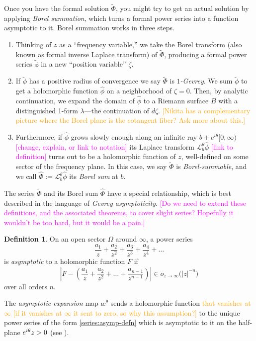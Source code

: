 \documentclass{article}
\let\Re\relax
\DeclareMathOperator{\Re}{Re}
\theoremstyle{definition}
\newtheorem{defn}{Definition}
\newcommand{\series}[1]{\tilde{#1}}
\newcommand{\laplace}{\mathcal{L}}
\newcommand{\aexp}{\text{\ae}}
\begin{document}
Once you have the formal solution $\series{\Phi}$, you might try to get an actual solution by applying {\em Borel summation}, which turns a formal power series into a function asymptotic to it. Borel summation works in three steps.
\begin{enumerate}
\item Thinking of $z$ as a ``frequency variable,'' we take the Borel transform (also known as formal inverse Laplace transform) of $\series{\Phi}$, producing a formal power series $\series{\phi}$ in a new ``position variable'' $\zeta$.
\item If $\series{\phi}$ has a positive radius of convergence we say $\series{\Phi}$ is {\em $1$-Gevrey}. We sum $\series{\phi}$ to get a holomorphic function $\hat{\phi}$ on a neighborhood of $\zeta = 0$. Then, by analytic continuation, we expand the domain of $\hat{\phi}$ to a Riemann surface $B$ with a distinguished 1-form $\lambda$---the continuation of $d\zeta$. \textcolor{orange}{[Nikita has a complementary picture where the Borel plane is the cotangent fiber? Ask more about this.]}
\item Furthermore, if $\hat{\phi}$ grows slowly enough along an infinite ray $b + e^{i\theta}[0, \infty)$ \textcolor{magenta}{[change, explain, or link to notation]} its Laplace transform $\laplace_b^\theta \hat{\phi}$ \textcolor{magenta}{[link to definition]} turns out to be a holomorphic function of $z$, well-defined on some sector of the frequency plane. In this case, we say $\tilde{\Phi}$ is {\em Borel-summable}, and we call $\hat{\Phi}:=\laplace_b^\theta \hat{\phi}$ its {\em Borel sum} at $b$. 
\end{enumerate}
The series $\series{\Phi}$ and its Borel sum $\hat{\Phi}$ have a special relationship, which is best described in the language of {\em Gevrey asymptoticity}. \textcolor{magenta}{[Do we need to extend these definitions, and the associated theorems, to cover slight series? Hopefully it wouldn't be too hard, but it would be a pain.]}
\begin{defn}
On an open sector $\Omega$ around $\infty$, a power series
\begin{equation}\label{series:asymp-defn}
\frac{a_1}{z} + \frac{a_2}{z^2} + \frac{a_3}{z^3} + \frac{a_4}{z^4} + \ldots
\end{equation}
is {\em asymptotic} to a holomorphic function $F$ if
\[ \left|F - \left(\frac{a_1}{z} + \frac{a_2}{z^2} + \ldots + \frac{a_{n-1}}{z^{n-1}} \right) \right| \in o_{z \to \infty}\big(|z|^{-n}\big) \]
over all orders $n$.

The {\em asymptotic expansion} map $\aexp^\theta$ sends a holomorphic function \textcolor{orange}{that vanishes at $\infty$ [if it vanishes at $\infty$ it sent to zero, so why this assumption?]} to the unique power series of the form \eqref{series:asymp-defn} which is asymptotic to it on the half-plane $\Re e^{i\theta}z > 0$ (see \cite[Theorem~C.11]{nikolaev2023existence}).
\end{defn}
\end{document}
